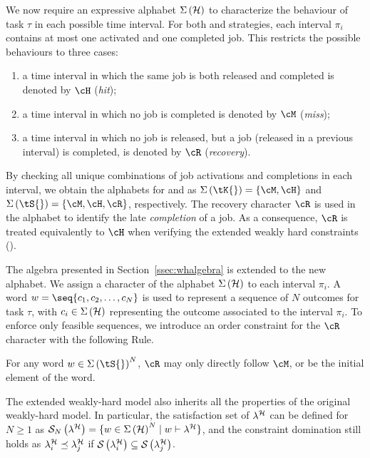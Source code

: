 We now require an expressive alphabet $\Sigma\left(\mathcal{H}\right)$ to characterize the behaviour of task $\tau$ in each possible time interval.
For both \tK{} and \tS{} strategies, each interval $\pi_i$ contains at most one activated and one completed job.
This restricts the possible behaviours to three cases:
\begin{enumerate}[label=(\roman*)]
    \item a time interval in which the same job is both released and completed is denoted by $\cH$ (\emph{hit});
    \item a time interval in which no job is completed is denoted by $\cM$ (\emph{miss});
    \item a time interval in which no job is released, but a job (released in a previous interval) is completed, is denoted by $\cR$ (\emph{recovery}).
\end{enumerate}
%
By checking all unique combinations of job activations and completions in each interval, we obtain the alphabets for \tK{} and \tS{} as $\Sigma\left(\tK{}\right) = \{ \cM, \cH \}$ and $\Sigma\left(\tS{}\right) = \{ \cM, \cH, \cR \}$, respectively.
The recovery character $\cR$ is used in the \tS{} alphabet to identify the late \emph{completion} of a job.
As a consequence, $\cR$ is treated equivalently to $\cH$ when verifying the extended weakly hard constraints (\ewhc{}).


The algebra presented in Section~\ref{ssec:whalgebra} is extended to the new alphabet.
We assign a character of the alphabet $\Sigma\left(\mathcal{H}\right)$ to each interval $\pi_i$.
A word $w = \seq{c_1,c_2,\dots,c_N}$ is used to represent a sequence of $N$ outcomes for task $\tau$, with $c_i \in \Sigma\left(\mathcal{H}\right)$ representing the outcome associated to the interval $\pi_i$. 
To enforce only feasible sequences, we introduce an order constraint for the $\cR$ character with the following Rule.
%
\begin{rule_}%
    \label{rule:R}%
    For any word $w \in \Sigma\left(\tS{}\right)^N$, $\cR$ may only directly follow $\cM$, or be the initial element of the word.
\end{rule_}

The extended weakly-hard model also inherits all the properties of the original weakly-hard model.
In particular, the satisfaction set of $\lambda^{\mathcal{H}}$ can be defined for $N\geq 1$ as $\mathcal{S}_{N}\left( \lambda^{\mathcal{H}} \right) = \{ w \in \Sigma\left(\mathcal{H}\right)^N \mid w \vdash \lambda^{\mathcal{H}} \}$, and the constraint domination still holds as $\lambda^{\mathcal{H}}_{i} \preceq \lambda^{\mathcal{H}}_{j}$ if $\mathcal{S}_{}\left( \lambda^{\mathcal{H}}_{i} \right) \subseteq \mathcal{S}_{}\left( \lambda^{\mathcal{H}}_{j} \right)$.
